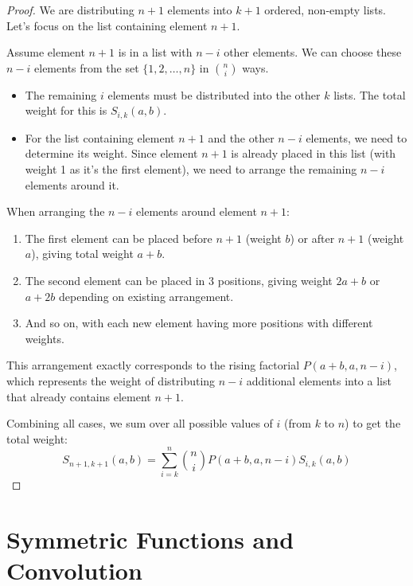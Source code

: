 \documentclass{article}
\newcommand{\gsn}[2]{S_{#1,#2}(a,b)}
\newcommand{\rising}[3]{P(#1,#2,#3)}
\begin{document}
\begin{proof}
We are distributing $n+1$ elements into $k+1$ ordered, non-empty lists. Let's focus on the list containing element $n+1$.

Assume element $n+1$ is in a list with $n-i$ other elements. We can choose these $n-i$ elements from the set $\{1, 2, \ldots, n\}$ in $\binom{n}{i}$ ways.

\begin{itemize}
    \item The remaining $i$ elements must be distributed into the other $k$ lists. The total weight for this is $\gsn{i}{k}$.
    
    \item For the list containing element $n+1$ and the other $n-i$ elements, we need to determine its weight. Since element $n+1$ is already placed in this list (with weight 1 as it's the first element), we need to arrange the remaining $n-i$ elements around it.
\end{itemize}

When arranging the $n-i$ elements around element $n+1$:
\begin{enumerate}
    \item The first element can be placed before $n+1$ (weight $b$) or after $n+1$ (weight $a$), giving total weight $a+b$.
    \item The second element can be placed in 3 positions, giving weight $2a+b$ or $a+2b$ depending on existing arrangement.
    \item And so on, with each new element having more positions with different weights.
\end{enumerate}

This arrangement exactly corresponds to the rising factorial $\rising{a+b}{a}{n-i}$, which represents the weight of distributing $n-i$ additional elements into a list that already contains element $n+1$.

Combining all cases, we sum over all possible values of $i$ (from $k$ to $n$) to get the total weight:
\begin{equation}
\gsn{n+1}{k+1}=\sum_{i=k}^{n}\binom{n}{i} \rising{a+b}{a}{n-i} \gsn{i}{k}
\end{equation}
\end{proof}

\section{Symmetric Functions and Convolution}
\end{document}
